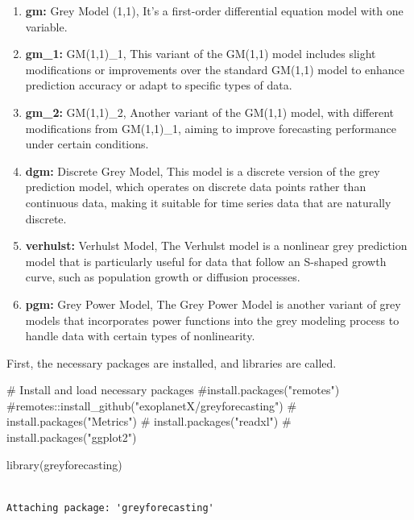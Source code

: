 \documentclass[
  11pt,
  a4paper,
  DIV=11,
  numbers=noendperiod]{scrartcl}
\newenvironment{Shaded}{\begin{snugshade}}{\end{snugshade}}
\newcommand{\CommentTok}[1]{\textcolor[rgb]{0.37,0.37,0.37}{#1}}
\newcommand{\FunctionTok}[1]{\textcolor[rgb]{0.28,0.35,0.67}{#1}}
\newcommand{\NormalTok}[1]{\textcolor[rgb]{0.00,0.23,0.31}{#1}}
\begin{document}
\begin{enumerate}
\def\labelenumi{\arabic{enumi}.}
\item
  \textbf{gm:} Grey Model (1,1), It's a first-order differential
  equation model with one variable.
\item
  \textbf{gm\_1:} GM(1,1)\_1, This variant of the GM(1,1) model includes
  slight modifications or improvements over the standard GM(1,1) model
  to enhance prediction accuracy or adapt to specific types of data.
\item
  \textbf{gm\_2:} GM(1,1)\_2, Another variant of the GM(1,1) model, with
  different modifications from GM(1,1)\_1, aiming to improve forecasting
  performance under certain conditions.
\item
  \textbf{dgm:} Discrete Grey Model, This model is a discrete version of
  the grey prediction model, which operates on discrete data points
  rather than continuous data, making it suitable for time series data
  that are naturally discrete.
\item
  \textbf{verhulst:} Verhulst Model, The Verhulst model is a nonlinear
  grey prediction model that is particularly useful for data that follow
  an S-shaped growth curve, such as population growth or diffusion
  processes.
\item
  \textbf{pgm:} Grey Power Model, The Grey Power Model is another
  variant of grey models that incorporates power functions into the grey
  modeling process to handle data with certain types of nonlinearity.
\end{enumerate}

First, the necessary packages are installed, and libraries are called.

\begin{Shaded}
\begin{Highlighting}[]
\CommentTok{\# Install and load necessary packages}
\CommentTok{\#install.packages("remotes")}
\CommentTok{\#remotes::install\_github("exoplanetX/greyforecasting")}
\CommentTok{\# install.packages("Metrics")}
\CommentTok{\# install.packages("readxl")}
\CommentTok{\# install.packages("ggplot2")}

\FunctionTok{library}\NormalTok{(greyforecasting)}
\end{Highlighting}
\end{Shaded}

\begin{verbatim}

Attaching package: 'greyforecasting'
\end{verbatim}
\end{document}
